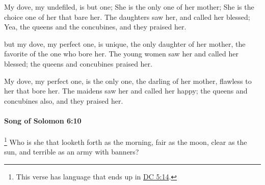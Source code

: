 			\begin{versebox}
					\item[BHS] 
					\item[LXX] 
					\item[ASV] My dove, my undefiled, is but one; She is the only one of her mother; She is the choice one of her that bare her. The daughters saw her, and called her blessed; Yea, the queens and the concubines, and they praised her.
					\item[NIV] but my dove, my perfect one, is unique, the only daughter of her mother, the favorite of the one who bore her. The young women saw her and called her blessed; the queens and concubines praised her.
					\item[NRSV] My dove, my perfect one, is the only one, the darling of her mother, flawless to her that bore her. The maidens saw her and called her happy; the queens and concubines also, and they praised her.
			\end{versebox}

		\paragraph{Song of Solomon 6:10} %
			\label{SONGOFSOLOMON-6-10}

				\footnote{%
					This verse has language that ends up in \hyperref[DC5-14]{DC 5:14}.
					}%
			Who is she that looketh forth as the morning, fair as the moon, clear as the sun, and terrible as an army with banners?

